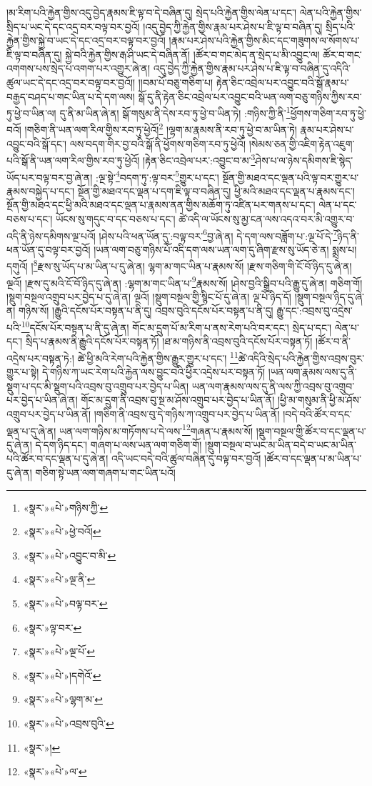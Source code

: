 །མ་རིག་པའི་རྐྱེན་གྱིས་འདུ་བྱེད་རྣམས་ཇི་ལྟ་བ་དེ་བཞིན་དུ། སྲེད་པའི་རྐྱེན་གྱིས་ལེན་པ་དང་། ལེན་པའི་རྐྱེན་གྱིས་སྲིད་པ་ཡང་དེ་དང་འདྲ་བར་བལྟ་བར་བྱའོ། །འདུ་བྱེད་ཀྱི་རྐྱེན་གྱིས་རྣམ་པར་ཤེས་པ་ཇི་ལྟ་བ་བཞིན་དུ། སྲིད་པའི་རྐྱེན་གྱིས་སྐྱེ་བ་ཡང་དེ་དང་འདྲ་བར་བལྟ་བར་བྱའོ། །རྣམ་པར་ཤེས་པའི་རྐྱེན་གྱིས་མིང་དང་གཟུགས་ལ་སོགས་པ་ཇི་ལྟ་བ་བཞིན་དུ། སྐྱེ་བའི་རྐྱེན་གྱིས་རྒ་ཤི་ཡང་དེ་བཞིན་ནོ། །ཚོར་བ་གང་མེད་ན་སྲེད་པ་མི་འབྱུང་ལ། ཚོར་བ་གང་འགགས་པས་སྲེད་པ་འགག་པར་འགྱུར་ཞེ་ན། འདུ་བྱེད་ཀྱི་རྐྱེན་གྱིས་རྣམ་པར་ཤེས་པ་ཇི་ལྟ་བ་བཞིན་དུ་འདིའི་ཚུལ་ཡང་དེ་དང་འདྲ་བར་བལྟ་བར་བྱའོ།། །།བམ་པོ་བཅུ་གཅིག་པ། རྟེན་ཅིང་འབྲེལ་པར་འབྱུང་བའི་སྒོ་རྣམ་པ་བརྒྱད་བཤད་པ་གང་ཡིན་པ་དེ་དག་ལས། སྒོ་དུ་ནི་རྟེན་ཅིང་འབྲེལ་པར་འབྱུང་བའི་ཡན་ལག་བཅུ་གཉིས་ཀྱིས་རབ་ཏུ་ཕྱེ་བ་ཡིན་ལ། དུ་ནི་མ་ཡིན་ཞེ་ན། སྒོ་གསུམ་ནི་དེས་རབ་ཏུ་ཕྱེ་བ་ཡིན་ཏེ། :གཉིས་ཀྱི་ནི་\footnote{«སྣར་»«པེ་»གཉིས་ཀྱི་}ཕྱོགས་གཅིག་རབ་ཏུ་ཕྱེ་བའོ། །གཅིག་ནི་ཡན་ལག་རིལ་གྱིས་རབ་ཏུ་ཕྱེའོ།\footnote{«སྣར་»«པེ་»ཕྱེ་བའོ།} །ལྷག་མ་རྣམས་ནི་རབ་ཏུ་ཕྱེ་བ་མ་ཡིན་ཏེ། རྣམ་པར་ཤེས་པ་འབྱུང་བའི་སྒོ་དང་། ལས་བདག་གིར་བྱ་བའི་སྒོ་ནི་ཕྱོགས་གཅིག་རབ་ཏུ་ཕྱེའོ། །སེམས་ཅན་གྱི་འཇིག་རྟེན་འཇུག་པའི་སྒོ་ནི་ཡན་ལག་རིལ་གྱིས་རབ་ཏུ་ཕྱེའོ། །རྟེན་ཅིང་འབྲེལ་པར་:འབྱུང་བ་མ་\footnote{«སྣར་»«པེ་»འབྱུང་བ་མི་}ཤེས་པ་ལ་ཉེས་དམིགས་ཇི་སྙེད་ཡོད་པར་བལྟ་བར་བྱ་ཞེ་ན། :ལྔ་སྟེ་\footnote{«སྣར་»«པེ་»ལྔ་ནི་}བདག་ཏུ་:ལྟ་བར་\footnote{«སྣར་»«པེ་»བལྟ་བར་}གྱུར་པ་དང་། སྔོན་གྱི་མཐའ་དང་ལྡན་པའི་ལྟ་བར་གྱུར་པ་རྣམས་བསྐྱེད་པ་དང་། སྔོན་གྱི་མཐའ་དང་ལྡན་པ་དག་ཇི་ལྟ་བ་བཞིན་དུ། ཕྱི་མའི་མཐའ་དང་ལྡན་པ་རྣམས་དང་། སྔོན་གྱི་མཐའ་དང་ཕྱི་མའི་མཐའ་དང་ལྡན་པ་རྣམས་ནན་གྱིས་མཆོག་ཏུ་འཛིན་པར་གནས་པ་དང་། ལེན་པ་དང་བཅས་པ་དང་། ཡོངས་སུ་གདུང་བ་དང་བཅས་པ་དང་། ཚེ་འདི་ལ་ཡོངས་སུ་མྱ་ངན་ལས་འདའ་བར་མི་འགྱུར་བ་འདི་ནི་ཉེས་དམིགས་ལྔ་པའོ། །ཤེས་པའི་ཕན་ཡོན་དུ་:བལྟ་བར་\footnote{«སྣར་»ལྟ་བར་}བྱ་ཞེ་ན། དེ་དག་ལས་བཟློག་པ་:ལྔ་པོ་དེ་\footnote{«སྣར་»«པེ་»ལྔ་པོ་}ཉིད་ནི་ཕན་ཡོན་དུ་བལྟ་བར་བྱའོ། །ཡན་ལག་བཅུ་གཉིས་པོ་འདི་དག་ལས་ཡན་ལག་དུ་ཞིག་རྫས་སུ་ཡོད་ཅེ་ན། སྨྲས་པ། དགུའོ། །\footnote{«སྣར་»«པེ་»།དགེའོ་}རྫས་སུ་ཡོད་པ་མ་ཡིན་པ་དུ་ཞེ་ན། ལྷག་མ་གང་ཡིན་པ་རྣམས་སོ། །རྫས་གཅིག་གི་ངོ་བོ་ཉིད་དུ་ཞེ་ན། ལྔའོ། །རྫས་དུ་མའི་ངོ་བོ་ཉིད་དུ་ཞེ་ན། :ལྷག་མ་གང་ཡིན་པ་\footnote{«སྣར་»«པེ་»ལྷག་མ་}རྣམས་སོ། །ཤེས་བྱའི་སྒྲིབ་པའི་རྒྱུ་དུ་ཞེ་ན། གཅིག་གོ། །སྡུག་བསྔལ་འགྲུབ་པར་བྱེད་པ་དུ་ཞེ་ན། ལྔའོ། །སྡུག་བསྔལ་གྱི་སྙིང་པོ་དུ་ཞེ་ན། ལྔ་པོ་ཉིད་དོ། །སྡུག་བསྔལ་ཉིད་དུ་ཞེ་ན། གཉིས་སོ། །རྒྱུའི་དངོས་པོར་བསྟན་པ་ནི་དུ། འབྲས་བུའི་དངོས་པོར་བསྟན་པ་ནི་དུ། རྒྱུ་དང་:འབྲས་བུ་འདྲེས་པའི་\footnote{«སྣར་»«པེ་»འབྲས་བུའི་}དངོས་པོར་བསྟན་པ་ནི་དུ་ཞེ་ན། གོང་མ་དྲུག་པོ་མ་རིག་པ་ནས་རེག་པའི་བར་དང་། སྲེད་པ་དང་། ལེན་པ་དང་། སྲིད་པ་རྣམས་ནི་རྒྱུའི་དངོས་པོར་བསྟན་ཏོ། །ཐ་མ་གཉིས་ནི་འབྲས་བུའི་དངོས་པོར་བསྟན་ཏོ། །ཚོར་བ་ནི་འདྲེས་པར་བསྟན་ཏེ:། ཚེ་ཕྱི་མའི་རེག་པའི་རྐྱེན་གྱིས་རྒྱུར་གྱུར་པ་དང་། \footnote{«སྣར་»།  }ཚེ་འདིའི་སྲེད་པའི་རྐྱེན་གྱིས་འབྲས་བུར་གྱུར་པ་སྟེ། དེ་གཉིས་ཀ་ཡང་རེག་པའི་རྐྱེན་ལས་བྱུང་བའི་ཕྱིར་འདྲེས་པར་བསྟན་ཏོ། །ཡན་ལག་རྣམས་ལས་དུ་ནི་སྡུག་པ་དང་མི་སྡུག་པའི་འབྲས་བུ་འགྲུབ་པར་བྱེད་པ་ཡིན། ཡན་ལག་རྣམས་ལས་དུ་ནི་ལས་ཀྱི་འབྲས་བུ་འགྲུབ་པར་བྱེད་པ་ཡིན་ཞེ་ན། གོང་མ་དྲུག་ནི་འབྲས་བུ་སྔ་མ་ཤོས་འགྲུབ་པར་བྱེད་པ་ཡིན་ནོ། །ཕྱི་མ་གསུམ་ནི་ཕྱི་མ་ཤོས་འགྲུབ་པར་བྱེད་པ་ཡིན་ནོ། །གཅིག་ནི་འབྲས་བུ་དེ་གཉིས་ཀ་འགྲུབ་པར་བྱེད་པ་ཡིན་ནོ། །བདེ་བའི་ཚོར་བ་དང་ལྡན་པ་དུ་ཞེ་ན། ཡན་ལག་གཉིས་མ་གཏོགས་པ་དེ་ལས་\footnote{«སྣར་»«པེ་»ལ་}གཞན་པ་རྣམས་སོ། །སྡུག་བསྔལ་གྱི་ཚོར་བ་དང་ལྡན་པ་དུ་ཞེ་ན། དེ་དག་ཉིད་དང་། གཞག་པ་ལས་ཡན་ལག་གཅིག་གོ། །སྡུག་བསྔལ་བ་ཡང་མ་ཡིན་བདེ་བ་ཡང་མ་ཡིན་པའི་ཚོར་བ་དང་ལྡན་པ་དུ་ཞེ་ན། འདི་ཡང་བདེ་བའི་ཚུལ་བཞིན་དུ་བལྟ་བར་བྱའོ། །ཚོར་བ་དང་ལྡན་པ་མ་ཡིན་པ་དུ་ཞེ་ན། གཅིག་སྟེ་ཡན་ལག་གཞག་པ་གང་ཡིན་པའོ། 
